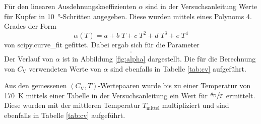 Für den linearen Ausdehnungskoeffizienten $\alpha$ sind in der Versuchsanleitung \cite{anleitung}
Werte für Kupfer in \SI{10}{\degree}-Schritten angegeben. Diese wurden mittels eines Polynoms
4. Grades der Form
\begin{equation}
    \alpha(T) = a + b\;T + c\;T^2 + d\;T^3 + e\;T^4
\end{equation}
von scipy.curve_fit gefittet. Dabei ergab sich für die Parameter
\begin{align}
    .
\end{align}
Der Verlauf von $\alpha$ ist in Abbildung \ref{fig:alpha} dargestellt.
Die für die Berechnung von $C_\text{V}$ verwendeten Werte von $\alpha$ sind ebenfalls
in Tabelle \ref{tab:cv} aufgeführt.


Aus den gemessenen $(C_\text{V}, T)$-Wertepaaren wurde bis zu einer Temperatur von
\SI{170}{\kelvin} mittels einer Tabelle in der
Versuchsanleitung ein Wert für $\sfrac{\theta_\text{D}}{T}$ ermittelt. Diese wurden
mit der mittleren Temperatur $T_\text{mittel}$ multipliziert und sind ebenfalls
in Tabelle \ref{tab:cv} aufgeführt.




